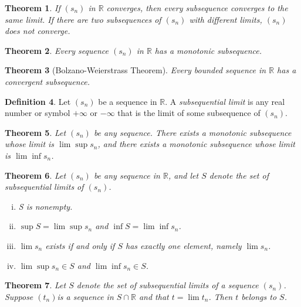 \documentclass[12pt, lettersize]{book}
\theoremstyle{plain}
\newtheorem{thm}{Theorem}[section]
\theoremstyle{definition}
\newtheorem{dfn}[thm]{Definition}
\theoremstyle{remark}
\newcommand{\R}{\mathbb{R}}
\begin{document}
		\begin{thm}\label{def:subsequence converges to the same limit}
			If $(s_n)$ in $\R$ converges, then every subsequence converges to the same limit. If there are two subsequences of $(s_n)$ with different limits, $(s_n)$ does not converge.
		\end{thm}
		
		\begin{thm}
			Every sequence $(s_n)$ in $\R$ has a monotonic subsequence.
		\end{thm}
		\setcounter{equation}{0}
		
		\begin{thm}[Bolzano-Weierstrass Theorem]\label{def:B-W}
			Every bounded sequence in $\R$ has a convergent subsequence.
		\end{thm}
		
		\begin{dfn}
			Let $(s_n)$ be a sequence in $\mathbb{R}$. A \emph{subsequential limit} is any real number or symbol $+\infty$ or $-\infty$ that is the limit of some subsequence of $(s_n)$.
		\end{dfn}
		
		\setcounter{equation}{0}
		\begin{thm}\label{def:subsequence with limit limsup or liminf}
			Let $(s_n)$ be any sequence. There exists a monotonic subsequence whose limit is $\lim\sup s_n$, and there exists a monotonic subsequence whose limit is $\lim\inf s_n$.
		\end{thm}
		
		\begin{thm}\label{def:subsequential limit condition}
			Let $(s_n)$ be any sequence in $\mathbb{R}$, and let $S$ denote the set of subsequential limits of $(s_n)$.
			\begin{enumerate}[(i)]
				\item S is nonempty.
				\item $\sup S=\lim\sup s_n$ and $\inf S=\lim\inf s_n$.
				\item $\lim s_n$ exists if and only if $S$ has exactly one element, namely $\lim s_n$.
				\item $\lim\sup s_n\in S$ and $\lim\inf s_n\in S$.
			\end{enumerate}
		\end{thm}
		
		\begin{thm}
			Let $S$ denote the set of subsequential limits of a sequence $(s_n)$. Suppose $(t_n)$is a sequence in $S\cap\mathbb{R}$ and that $t=\lim t_n$. Then $t$ belongs to $S$.
		\end{thm}
	
\end{document}

